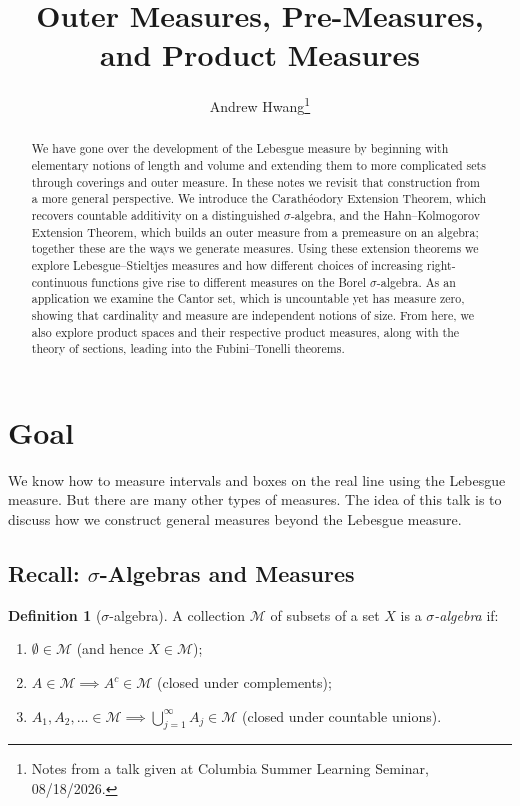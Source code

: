 \documentclass[11pt]{article}
\title{\textbf{Outer Measures, Pre-Measures, and Product Measures}}
\author{Andrew Hwang\thanks{Notes from a talk given at Columbia Summer Learning Seminar, 08/18/2026.}}
\date{}
\theoremstyle{definition}
\newtheorem{definition}{Definition}[section]
\theoremstyle{plain}
\newcommand{\M}{\mathcal{M}}
\begin{document}
\maketitle

\begin{abstract}
\noindent
We have gone over the development of the Lebesgue measure by beginning
with elementary notions of length and volume and extending them to more
complicated sets through coverings and outer measure. In these notes we
revisit that construction from a more general perspective. We introduce
the Carath\'eodory Extension Theorem, which recovers countable
additivity on a distinguished $\sigma$-algebra, and the
Hahn--Kolmogorov Extension Theorem, which builds an outer measure from
a premeasure on an algebra; together these are the ways we generate
measures. Using these extension theorems we explore
Lebesgue--Stieltjes measures and how different choices of increasing
right-continuous functions give rise to different measures on the Borel
$\sigma$-algebra. As an application we examine the Cantor set, which is
uncountable yet has measure zero, showing that cardinality and measure
are independent notions of size. From here, we also explore product
spaces and their respective product measures, along with the theory of
sections, leading into the Fubini--Tonelli theorems.
\end{abstract}

\tableofcontents

\section{Goal}

We know how to measure intervals and boxes on the real line using the
Lebesgue measure. But there are many other types of measures. The idea
of this talk is to discuss how we construct general measures beyond the
Lebesgue measure.

\subsection{Recall: \texorpdfstring{$\sigma$}{sigma}-Algebras and Measures}

\begin{definition}[$\sigma$-algebra]
A collection $\M$ of subsets of a set $X$ is a \emph{$\sigma$-algebra}
if:
\begin{enumerate}[label=\arabic*.]
  \item $\emptyset \in \M$ (and hence $X \in \M$);
  \item $A \in \M \implies A^{c} \in \M$ (closed under complements);
  \item $A_1, A_2, \ldots \in \M \implies \bigcup_{j=1}^{\infty} A_j \in \M$
        (closed under countable unions).
\end{enumerate}
\end{definition}
\end{document}
